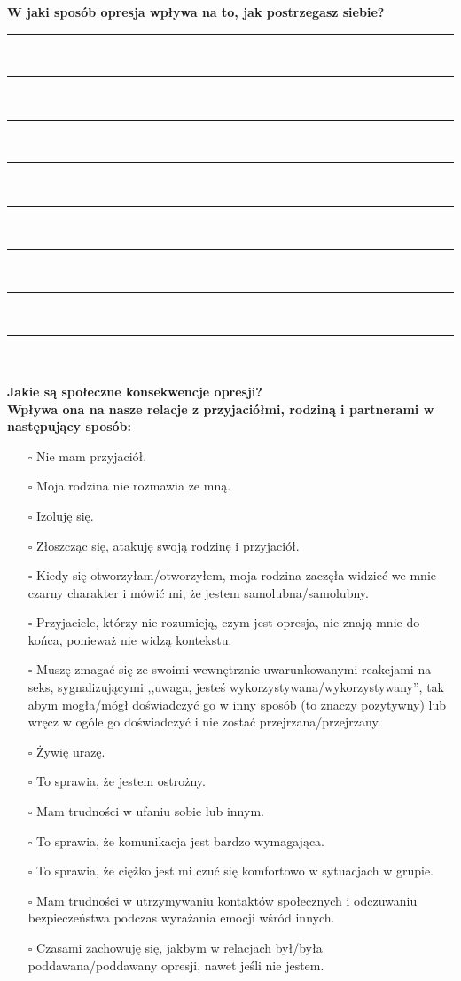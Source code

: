 \newpage
\noindent
\textcolor{ProcessBlue}{\textbf{\Large{W jaki sposób opresja wpływa na to, jak postrzegasz siebie?}}}\\
\noindent\rule{\textwidth}{1pt}\\
\noindent\rule{\textwidth}{1pt}\\
\noindent\rule{\textwidth}{1pt}\\
\noindent\rule{\textwidth}{1pt}\\
\noindent\rule{\textwidth}{1pt}\\
\noindent\rule{\textwidth}{1pt}\\
\noindent\rule{\textwidth}{1pt}\\
\noindent\rule{\textwidth}{1pt}\\\\

\noindent\textcolor{ProcessBlue}{\textbf{\Large{Jakie są społeczne konsekwencje opresji?}}}\\
\textbf{\large{Wpływa ona na nasze relacje z przyjaciółmi, rodziną i partnerami w następujący sposób:}}
\begin{multicols}{2}
\begin{itemize}
\item[$\square$]{Nie mam przyjaciół.}
\item[$\square$]{Moja rodzina nie rozmawia ze mną.}
\item[$\square$]{Izoluję się.}
\item[$\square$]{Złoszcząc się, atakuję swoją rodzinę i przyjaciół.}
\item[$\square$]{Kiedy się otworzyłam/otworzyłem, moja rodzina zaczęła widzieć we mnie czarny charakter i mówić mi, że jestem samolubna/samolubny.}
\item[$\square$]{Przyjaciele, którzy nie rozumieją, czym jest opresja, nie znają mnie do końca, ponieważ nie widzą kontekstu.}
\item[$\square$]{Muszę zmagać się ze swoimi wewnętrznie uwarunkowanymi reakcjami na seks, sygnalizującymi ,,uwaga, jesteś wykorzystywana/wykorzystywany'', tak abym mogła/mógł doświadczyć go w inny sposób (to znaczy pozytywny) lub wręcz w ogóle go doświadczyć i nie zostać przejrzana/przejrzany.}
\item[$\square$]{Żywię urazę.}
\item[$\square$]{To sprawia, że jestem ostrożny.}
\item[$\square$]{Mam trudności w ufaniu sobie lub innym.}
\item[$\square$]{To sprawia, że komunikacja jest bardzo wymagająca.}
\item[$\square$]{To sprawia, że ciężko jest mi czuć się komfortowo w sytuacjach w grupie.}
\item[$\square$]{Mam trudności w utrzymywaniu kontaktów społecznych i odczuwaniu bezpieczeństwa podczas wyrażania emocji wśród innych.}
\item[$\square$]{Czasami zachowuję się, jakbym w relacjach był/była poddawana/poddawany opresji, nawet jeśli nie jestem.}
\end{itemize}
\end{multicols}


